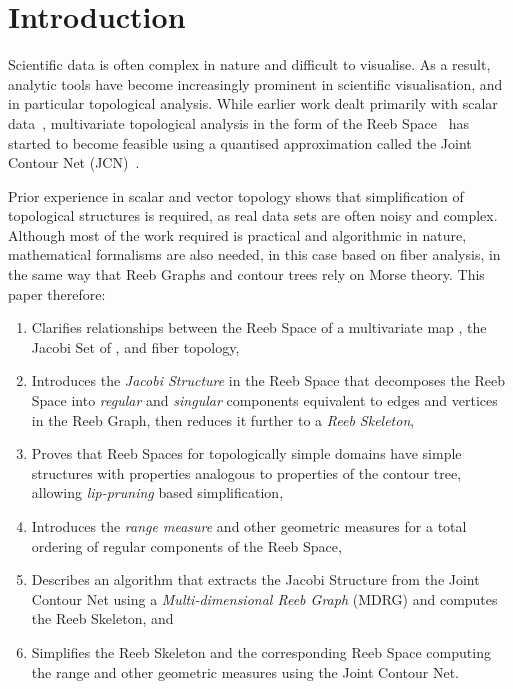 \documentclass[twocolumn]{article}
\begin{document}
\section{Introduction} 
\label{sec:intro}
Scientific data is often complex in nature and difficult to visualise.  As a result, 
analytic tools have become increasingly prominent in scientific visualisation,
and in particular topological analysis.  While earlier work dealt primarily with
scalar data~\cite{2003-Chiang-Simplification, 2004-Carr-simplification, 2012-Tierny-tvcg}, 
multivariate topological analysis in the form of the Reeb
Space~\cite{2004-Saeki, 2008-edels-reebspace}
has started to become feasible using a quantised approximation called the Joint 
Contour Net (JCN)~\cite{2013-Carr-TVCG}.

Prior experience in scalar and vector topology shows that simplification of
topological structures is required, as real data sets are often noisy and 
complex.  Although most of the work required is practical and algorithmic in 
nature, mathematical formalisms are also needed, in this case based on fiber 
analysis, in the same way that Reeb Graphs and contour trees rely on Morse theory.
This paper therefore:
\begin{enumerate}\itemsep=.8pt
\item	Clarifies relationships between the Reeb Space of a multivariate map , 
the Jacobi Set of , and fiber topology,
\item	Introduces the \emph{Jacobi Structure} in the Reeb Space that decomposes the
Reeb Space into \emph{regular} and \emph{singular} components equivalent to edges and vertices
in the Reeb Graph, then reduces it further to a \textit{Reeb Skeleton}, 
\item	Proves that Reeb Spaces for topologically simple domains have simple structures
with properties analogous to properties of the contour tree, allowing
\emph{lip-pruning} based simplification,
\item	Introduces the \emph{range measure} and other geometric measures
  for a total ordering of regular components of the Reeb Space,
\item	Describes an algorithm that extracts the Jacobi Structure from the Joint Contour Net 
using a \textit{Multi-dimensional Reeb Graph} (MDRG) and computes the Reeb Skeleton, 
and
\item	Simplifies the Reeb Skeleton and the corresponding Reeb Space
  computing the range and other geometric measures using the Joint Contour Net. 
\end{enumerate}
\end{document}
